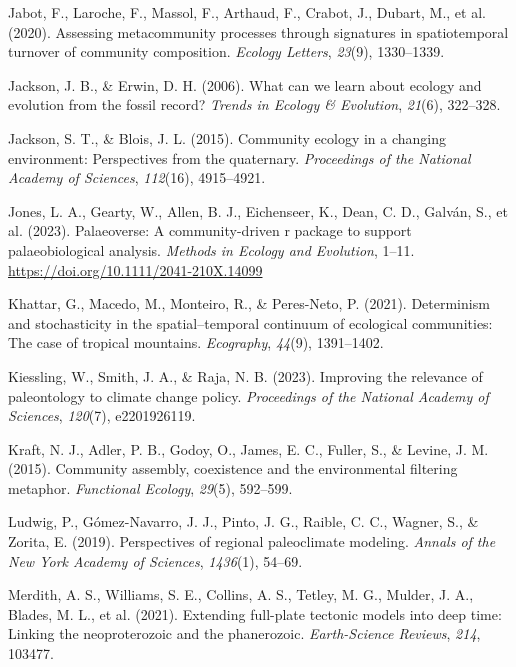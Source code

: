 \documentclass[
]{agujournal2019}
\newlength{\cslhangindent}
\newenvironment{CSLReferences}[2] %
 {\begin{list}{}{%
  \setlength{\itemindent}{0pt}
  \setlength{\leftmargin}{0pt}
  \setlength{\parsep}{0pt}
  \ifodd #1
   \setlength{\leftmargin}{\cslhangindent}
   \setlength{\itemindent}{-1\cslhangindent}
  \fi
  \setlength{\itemsep}{#2\baselineskip}}}
 {\end{list}}
\begin{document}
\begin{CSLReferences}{1}{0}
Jabot, F., Laroche, F., Massol, F., Arthaud, F., Crabot, J., Dubart, M.,
et al. (2020). Assessing metacommunity processes through signatures in
spatiotemporal turnover of community composition. \emph{Ecology
Letters}, \emph{23}(9), 1330--1339.

Jackson, J. B., \& Erwin, D. H. (2006). What can we learn about ecology
and evolution from the fossil record? \emph{Trends in Ecology \&
Evolution}, \emph{21}(6), 322--328.

Jackson, S. T., \& Blois, J. L. (2015). Community ecology in a changing
environment: Perspectives from the quaternary. \emph{Proceedings of the
National Academy of Sciences}, \emph{112}(16), 4915--4921.

Jones, L. A., Gearty, W., Allen, B. J., Eichenseer, K., Dean, C. D.,
Galván, S., et al. (2023). Palaeoverse: A community-driven r package to
support palaeobiological analysis. \emph{Methods in Ecology and
Evolution}, 1--11. \url{https://doi.org/10.1111/2041-210X.14099}

Khattar, G., Macedo, M., Monteiro, R., \& Peres-Neto, P. (2021).
Determinism and stochasticity in the spatial--temporal continuum of
ecological communities: The case of tropical mountains.
\emph{Ecography}, \emph{44}(9), 1391--1402.

Kiessling, W., Smith, J. A., \& Raja, N. B. (2023). Improving the
relevance of paleontology to climate change policy. \emph{Proceedings of
the National Academy of Sciences}, \emph{120}(7), e2201926119.

Kraft, N. J., Adler, P. B., Godoy, O., James, E. C., Fuller, S., \&
Levine, J. M. (2015). Community assembly, coexistence and the
environmental filtering metaphor. \emph{Functional Ecology},
\emph{29}(5), 592--599.

Ludwig, P., Gómez-Navarro, J. J., Pinto, J. G., Raible, C. C., Wagner,
S., \& Zorita, E. (2019). Perspectives of regional paleoclimate
modeling. \emph{Annals of the New York Academy of Sciences},
\emph{1436}(1), 54--69.

Merdith, A. S., Williams, S. E., Collins, A. S., Tetley, M. G., Mulder,
J. A., Blades, M. L., et al. (2021). Extending full-plate tectonic
models into deep time: Linking the neoproterozoic and the phanerozoic.
\emph{Earth-Science Reviews}, \emph{214}, 103477.


\end{CSLReferences}
\end{document}
